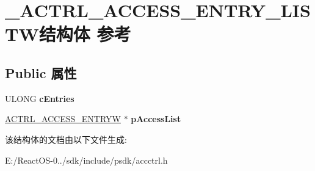 \hypertarget{struct___a_c_t_r_l___a_c_c_e_s_s___e_n_t_r_y___l_i_s_t_w}{}\section{\+\_\+\+A\+C\+T\+R\+L\+\_\+\+A\+C\+C\+E\+S\+S\+\_\+\+E\+N\+T\+R\+Y\+\_\+\+L\+I\+S\+T\+W结构体 参考}
\label{struct___a_c_t_r_l___a_c_c_e_s_s___e_n_t_r_y___l_i_s_t_w}
\subsection*{Public 属性}
\begin{DoxyCompactItemize}
\item 
\mbox{\label{struct___a_c_t_r_l___a_c_c_e_s_s___e_n_t_r_y___l_i_s_t_w_ad560aad2d16b35f98a357c4aa91dc766}} 
U\+L\+O\+NG {\bfseries c\+Entries}
\item 
\mbox{\label{struct___a_c_t_r_l___a_c_c_e_s_s___e_n_t_r_y___l_i_s_t_w_aadc6e8c35f0ef57cd83a17a2fb66aa07}} 
\hyperlink{struct___a_c_t_r_l___a_c_c_e_s_s___e_n_t_r_y_w}{A\+C\+T\+R\+L\+\_\+\+A\+C\+C\+E\+S\+S\+\_\+\+E\+N\+T\+R\+YW} $\ast$ {\bfseries p\+Access\+List}
\end{DoxyCompactItemize}


该结构体的文档由以下文件生成\+:\begin{DoxyCompactItemize}
\item 
E\+:/\+React\+O\+S-\/0../sdk/include/psdk/accctrl.\+h\end{DoxyCompactItemize}
